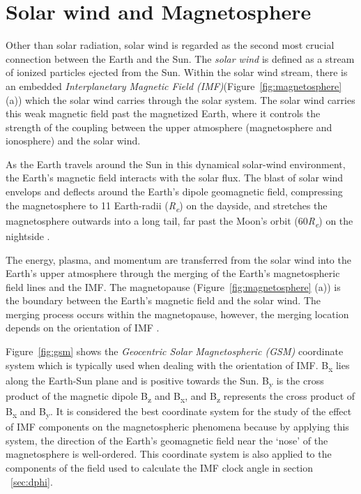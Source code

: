 \documentclass[12pt]{report} %
\begin{document}
\section{Solar wind and Magnetosphere} \label{sec:solarwind}
\vspace{-5pt}
Other than solar radiation, solar wind is regarded as the second most crucial connection between the Earth and the Sun. The \emph{solar wind} is defined as a stream of ionized particles ejected from the Sun. Within the solar wind stream, there is an embedded \emph{Interplanetary Magnetic Field (IMF)}(Figure~\ref{fig:magnetosphere} (a)) which the solar wind carries through the solar system. The solar wind carries this weak magnetic field past the magnetized Earth, where it controls the strength of the coupling between the upper atmosphere (magnetosphere and ionosphere) and the solar wind.
	
As the Earth travels around the Sun in this dynamical solar-wind environment, the Earth's magnetic field interacts with the solar flux. The blast of solar wind envelops and deflects around the Earth's dipole geomagnetic field, compressing the magnetosphere to 11 Earth-radii (\textit{R\textsubscript{e}}) on the dayside, and stretches the magnetosphere outwards into a long tail, far past the Moon's orbit (60\textit{R\textsubscript{e}}) on the nightside \citep{campbell03}.
	
The energy, plasma, and momentum are transferred from the solar wind into the Earth's upper atmosphere through the merging of the Earth's magnetospheric field lines and the IMF. The magnetopause (Figure~\ref{fig:magnetosphere} (a)) is the boundary between the Earth's magnetic field and the solar wind. The merging process occurs within the magnetopause, however, the merging location depends  on the orientation of IMF \citep{russell00}.
	
Figure~\ref{fig:gsm} shows the \emph{Geocentric Solar Magnetospheric (GSM)} coordinate system which is typically used when dealing with the orientation of IMF. B\textsubscript{x} lies along the Earth-Sun plane and is positive towards the Sun. B\textsubscript{y} is the cross product of the magnetic dipole B\textsubscript{z} and  B\textsubscript{x}, and B\textsubscript{z} represents the cross product of B\textsubscript{x} and B\textsubscript{y}. It is considered the best coordinate system for the study of the effect of IMF components on the magnetospheric phenomena because by applying this system, the direction of the Earth's geomagnetic field near the `nose' of the magnetosphere is well-ordered. This coordinate system is also applied to the components of the field used to calculate the IMF clock angle in section ~\ref{sec:dphi}.
	
\end{document}
